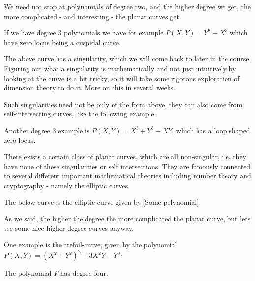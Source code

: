 We need not stop at polynomials of degree two, and the higher degree we get, the more complicated - and interesting - the planar curves get. 

\begin{example}
If we have degree 3 polynomials we have for example $P(X, Y)=Y^2-X^3$ which have zero locus being a cuspidal curve.
\begin{center}
\def\svgwidth{0.4\textwidth}

\end{center}
\end{example}

The above curve has a singularity, which we will come back to later in the course. Figuring out what a singularity is mathematically and not just intuitively by looking at the curve is a bit tricky, so it will take some rigorous exploration of dimension theory to do it. More on this in several weeks. 

Such singularities need not be only of the form above, they can also come from self-intersecting curves, like the following example. 

\begin{example}
Another degree 3 example is $P(X, Y) = X^3+Y^3 - XY$, which has a loop shaped zero locus. 
\begin{center}
\def\svgwidth{0.4\textwidth}

\end{center}
\end{example}

There exists a certain class of planar curves, which are all non-singular, i.e. they have none of these singularities or self intersections. They are famously connected to several different important mathematical theories including number theory and cryptography - namely the elliptic curves. 

\begin{example}
The below curve is the elliptic curve given by [Some polynomial]
%
\end{example}

As we said, the higher the degree the more complicated the planar curve, but lets see some nice higher degree curves anyway. 


\begin{example}
One example is the trefoil-curve, given by the polynomial $P(X,Y)=(X^2+Y^2)^2 + 3X^2Y-Y^3$:
\begin{center}
\def\svgwidth{0.4\textwidth}

\end{center}
The polynomial $P$ has degree four. 
\end{example}

